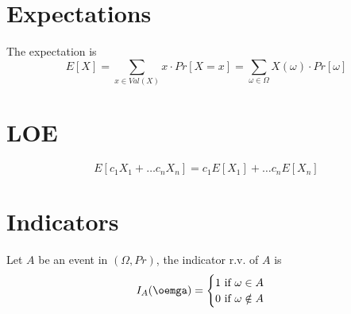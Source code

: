 \section{Expectations}

\begin{framed}
   The expectation is 
   \[
      E[X] = \sum_{x \in Val(X)} x \cdot Pr[X = x] = \sum_{\omega \in \Omega} X(\omega) \cdot Pr[\omega]
   \] 
\end{framed}

\section{LOE}
\begin{framed}
   \[
      E[c_1 X_1 + \hdots c_n X_n] = c_1 E[X_1] + \hdots c_n E[X_n]
   \]  
  
\end{framed}

\section{Indicators}

\begin{framed}
   Let $A$ be an event in $(\Omega, Pr)$, the indicator r.v. of $A$ is
   \[
     I_A(\oemga) = 
     \begin{cases}
        1 \text{ if } \omega \in A \\
        0 \text{ if } \omega \notin A \\
     \end{cases}
   \] 
\end{framed}

